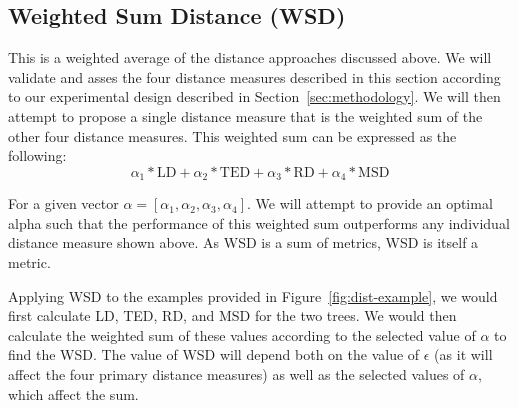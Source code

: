 \subsection{Weighted Sum Distance (WSD)}
\label{ssec:wsd}

This is a weighted average of the distance approaches discussed above. We will validate and asses the four distance measures described in this section according to our experimental design described in Section~\ref{sec:methodology}. We will then attempt to propose a single distance measure that is the weighted sum of the other four distance measures. This weighted sum can be expressed as the following:
\[
    \alpha_1*\text{LD}+ \alpha_2*\text{TED} + \alpha_3*\text{RD} + \alpha_4*\text{MSD}
\]

For a given vector $\alpha = [\alpha_1, \alpha_2, \alpha_3, \alpha_4]$. We will attempt to provide an optimal alpha such that the performance of this weighted sum outperforms any individual distance measure shown above. As WSD is a sum of metrics, WSD is itself a metric.

Applying WSD to the examples provided in Figure~\ref{fig:dist-example}, we would first calculate LD, TED, RD, and MSD for the two trees. We would then calculate the weighted sum of these values according to the selected value of $\alpha$ to find the WSD. The value of WSD will depend both on the value of $\epsilon$ (as it will affect the four primary distance measures) as well as the selected values of $\alpha$, which affect the sum.




